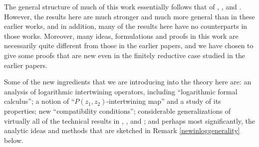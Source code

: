 \documentclass[12pt]{article}
\begin{document}
The general structure of much of this work essentially follows that of
\cite{tensor1}, \cite{tensor2}, \cite{tensor3} and \cite{tensor4}.
However, the results here are much stronger and much more general than in
these earlier works, and in addition, many of the results here have no
counterparts in those works.  Moreover, many ideas, formulations and
proofs in this work are necessarily quite different {}from those in the
earlier papers, and we have chosen to give some proofs that are new
even in the finitely reductive case studied in the earlier papers.

Some of the new ingredients that we are introducing into the theory
here are: an analysis of logarithmic intertwining operators, including
``logarithmic formal calculus''; a notion of
``$P(z_1,z_2)$-intertwining map'' and a study of its properties; new
``compatibility conditions''; considerable generalizations of
virtually all of the technical results in \cite{tensor1},
\cite{tensor2}, \cite{tensor3} and \cite{tensor4}; and perhaps most
significantly, the analytic ideas and methods that are sketched in
Remark \ref{newinloggenerality} below.
\end{document}
